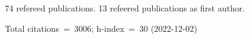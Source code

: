 74 refereed publications. 13 refeered publications as first author.

Total citations~=~3006; h-index~=~30 (2022-12-02)